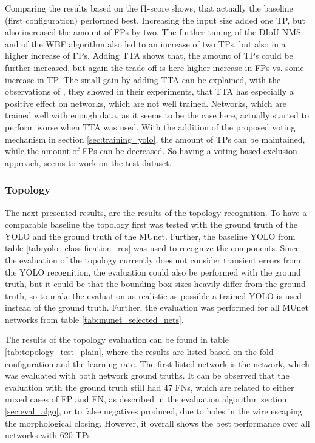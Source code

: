 Comparing the results based on the f1-score shows, that actually the baseline (first configuration) performed best.
Increasing the input size added one \ac{TP}, but also increased the amount of \acp{FP} by two.
The further tuning of the \ac{DIoU}-\ac{NMS} and of the \ac{WBF} algorithm also led to an increase of two \acp{TP}, but also in a higher increase of \acp{FP}.
Adding \ac{TTA} shows that, the amount of \acp{TP} could be further increased, but again the trade-off is here higher increase in \acp{FP} vs. some increase in \ac{TP}.
The small gain by adding \ac{TTA} can be explained, with the observations of \cite{when_tta_works}, they showed in their experiments, that \ac{TTA} has especially a positive effect on networks, which are not well trained.
Networks, which are trained well with enough data, as it seems to be the case here, actually started to perform worse when \ac{TTA} was used.
With the addition of the proposed voting mechanism in section \ref{sec:training_yolo}, the amount of \acp{TP} can be maintained, while the amount of \acp{FP} can be decreased.
So having a voting based exclusion approach, seems to work on the test dataset.

\subsubsection{Topology}

The next presented results, are the results of the topology recognition.
To have a comparable baseline the topology first was tested with the ground truth of the \ac{YOLO} and the ground truth of the \ac{MUnet}.
Further, the baseline \ac{YOLO} from table \ref{tab:yolo_classification_res} was used to recognize the components.
Since the evaluation of the topology currently does not consider transient errors from the \ac{YOLO} recognition, the evaluation could also be performed with the ground truth, but it could be that the bounding box sizes heavily differ from the ground truth, so to make the evaluation as realistic as possible a trained \ac{YOLO} is used instead of the ground truth.
Further, the evaluation was performed for all \ac{MUnet} networks from table \ref{tab:munet_selected_nets}.

The results of the topology evaluation can be found in table \ref{tab:topology_test_plain}, where the results are listed based on the fold configuration and the learning rate.
The first listed network is the network, which was evaluated with both network ground truths.
It can be observed that the evaluation with the ground truth still had 47 \acp{FN}, which are related to either mixed cases of \ac{FP} and \ac{FN}, as described in the evaluation algorithm section \ref{sec:eval_algo}, or to false negatives produced, due to holes in the wire escaping the morphological closing.
However, it overall shows the best performance over all networks with 620 \acp{TP}.

